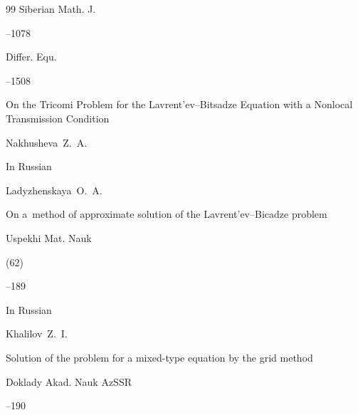 \begin{thebibliography}{99}
\jour Siberian Math. J.




--1078






\jour Differ. Equ.




--1508


\paper On the Tricomi Problem for the Lavrent'ev--Bitsadze Equation with a Nonlocal Transmission Condition

\by  Nakhusheva~Z.~A.




\lang In Russian

\by Ladyzhenskaya~O.~A.

\paper On a~method of approximate solution of the Lavrent'ev--Bicadze problem

\jour Uspekhi Mat. Nauk



(62)

--189




\lang In Russian

\by Khalilov~Z.~I.

\paper Solution of the problem for a mixed-type equation by the grid method

\jour Doklady Akad. Nauk AzSSR




--190







\end{thebibliography}
